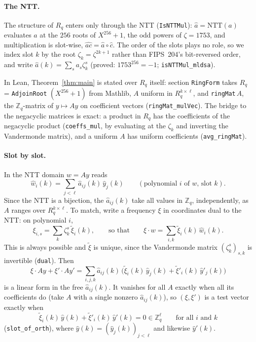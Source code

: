 \documentclass[11pt]{article}
\theoremstyle{definition}
\theoremstyle{remark}
\newcommand{\Zq}{\mathbb{Z}_q}
\newcommand{\Rq}{R_q}
\newcommand{\lean}[1]{\texttt{#1}}
\begin{document}
\paragraph{The NTT.}
The structure of $\Rq$ enters only through the NTT (\lean{IsNTTMul}):
$\hat a = \mathrm{NTT}(a)$ evaluates $a$ at the $256$ roots of $X^{256}+1$, the odd powers of
$\zeta = 1753$, and multiplication is slot-wise, $\widehat{ac} = \hat a\circ\hat c$. The order of
the slots plays no role, so we index slot $k$ by the root $\zeta_k = \zeta^{2k+1}$ rather than
FIPS~204's bit-reversed order, and write $\hat a(k) = \sum_s a_s\zeta_k^s$ (proved:
$1753^{256} = -1$; \lean{isNTTMul\_mldsa}).

\noindent In Lean, Theorem~\ref{thm:main} is stated over $\Rq$ itself: section \lean{RingForm}
takes $\Rq$ = \lean{AdjoinRoot} $(X^{256}+1)$ from Mathlib, $A$ uniform in
$\Rq^{k\times\ell}$, and \lean{ringMat}$\,A$, the $\Zq$-matrix of $y \mapsto Ay$ on
coefficient vectors (\lean{ringMat\_mulVec}). The bridge to the negacyclic matrices is exact: a
product in $\Rq$ has the coefficients of the negacyclic product (\lean{coeffs\_mul}, by
evaluating at the $\zeta_k$ and inverting the Vandermonde matrix), and a uniform $A$ has uniform
coefficients (\lean{avg\_ringMat}).

\paragraph{Slot by slot.}
In the NTT domain $w = Ay$ reads
\[
  \hat w_i(k) = \sum_{j<\ell} \hat a_{ij}(k)\,\hat y_j(k)\qquad(\text{polynomial $i$ of $w$, slot $k$}).
\]
Since the NTT is a bijection, the $\hat a_{ij}(k)$ take all values in $\Zq$, independently, as
$A$ ranges over $\Rq^{k\times\ell}$. To match, write a frequency $\xi$ in coordinates dual to the
NTT: on polynomial $i$,
\[
  \xi_{i,s} = \sum_k \zeta_k^s\,\tilde\xi_i(k),\qquad\text{so that}\qquad
  \xi\cdot w = \sum_{i,k}\tilde\xi_i(k)\,\hat w_i(k).
\]
This is always possible and $\tilde\xi$ is unique, since the Vandermonde matrix
$(\zeta_k^s)_{s,k}$ is invertible (\lean{dual}). Then
\[
  \xi\cdot Ay + \xi'\cdot Ay'= \sum_{i,j,k}\hat a_{ij}(k)\,\bigl(\tilde\xi_i(k)\,\hat y_j(k)
  +\tilde\xi'_i(k)\,\hat y'_j(k)\bigr)
\]
is a linear form in the free $\hat a_{ij}(k)$. It vanishes for all $A$ exactly when all its
coefficients do (take $A$ with a single nonzero $\hat a_{ij}(k)$), so $(\xi,\xi')$ is a test
vector exactly when
\[
  \tilde\xi_i(k)\,\hat y(k) + \tilde\xi'_i(k)\,\hat y'(k) = 0 \in \Zq^\ell
  \qquad\text{for all } i \text{ and } k
\]
(\lean{slot\_of\_orth}), where $\hat y(k) = (\hat y_j(k))_{j<\ell}$ and likewise $\hat y'(k)$.
\end{document}

